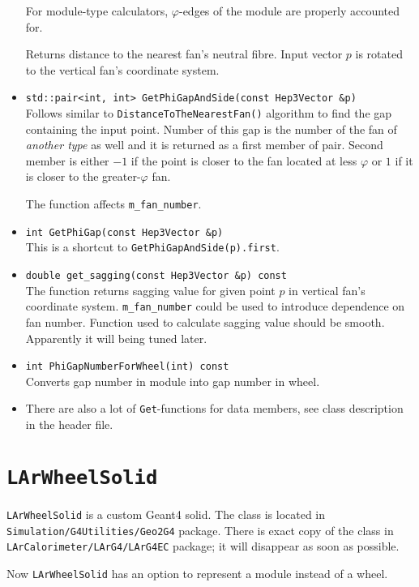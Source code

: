 \documentclass{article}
\begin{document}
\begin{itemize}
For module-type calculators, $\varphi$-edges of the module are properly
accounted for.

Returns distance to the nearest
fan's neutral fibre. Input vector $p$ is rotated to the vertical fan's
coordinate system.

\item {\tt std::pair<int, int> GetPhiGapAndSide(const Hep3Vector \&p)}\\
Follows similar to {\tt DistanceToTheNearestFan()} algorithm to find the gap
containing the input point. Number of this gap is the number of the fan of {\em
another type} as well and it is returned as a first member of pair. Second
member is 
either $-1$ if the point is closer to the fan located at less $\varphi$ or $1$
if it is closer to the greater-$\varphi$ fan.

The function affects {\tt m\_fan\_number}.

\item {\tt int GetPhiGap(const Hep3Vector \&p)}\\
This is a shortcut to {\tt GetPhiGapAndSide(p).first}.

\item {\tt double get\_sagging(const Hep3Vector \&p) const}\\
The function returns sagging value for given point $p$ in vertical fan's
coordinate system. {\tt m\_fan\_number} could be used to introduce dependence on
fan number. Function used to calculate sagging value should be smooth.
Apparently it will being tuned later.

\item {\tt int PhiGapNumberForWheel(int) const}\\
Converts gap number in module into gap number in wheel.

\item There are also a lot of {\tt Get}-functions for data members, see class
description in the header file.

\end{itemize}

\section{\tt LArWheelSolid}
{\tt LArWheelSolid} is a custom Geant4 solid. The class is located in
{\tt Simulation/G4Utilities/Geo2G4} package. There is exact copy of the class in
{\tt LArCalorimeter/LArG4/LArG4EC} package; it will disappear as soon as
possible.

Now {\tt LArWheelSolid} has an option to represent a module instead of a wheel.
\end{document}
